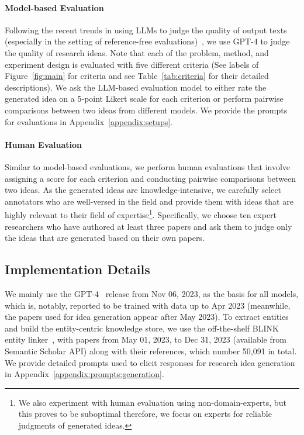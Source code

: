 \documentclass[11pt]{article}
\begin{document}
\paragraph{Model-based Evaluation}
Following the recent trends in using LLMs to judge the quality of output texts (especially in the setting of reference-free evaluations)~\cite{LLM/Judge/1, LLM/Judge/2, G-Eval}, we use GPT-4 to judge the quality of research ideas. Note that each of the problem, method, and experiment design is evaluated with five different criteria (See labels of Figure~\ref{fig:main} for criteria and see Table~\ref{tab:criteria} for their detailed descriptions). We ask the LLM-based evaluation model to either rate the generated idea on a 5-point Likert scale for each criterion or perform pairwise comparisons between two ideas from different models. We provide the prompts for evaluations in Appendix~\ref{appendix:setups}.  

\paragraph{Human Evaluation}
Similar to model-based evaluations, we perform human evaluations that involve assigning a score for each criterion and conducting pairwise comparisons between two ideas. As the generated ideas are knowledge-intensive, we carefully select annotators who are well-versed in the field and provide them with ideas that are highly relevant to their field of expertise\footnote{We also experiment with human evaluation using non-domain-experts, but this proves to be suboptimal therefore, we focus on experts for reliable judgments of generated ideas.}. Specifically, we choose ten expert researchers who have authored at least three papers and ask them to judge only the ideas that are generated based on their own papers.

\subsection{Implementation Details}
We mainly use the GPT-4~\cite{GPT-4} release from Nov 06, 2023, as the basis for all models, which is, notably, reported to be trained with data up to Apr 2023 (meanwhile, the papers used for idea generation appear after May 2023). To extract entities and build the entity-centric knowledge store, we use the off-the-shelf BLINK entity linker~\cite{blink}, with papers from May 01, 2023, to Dec 31, 2023 (available from Semantic Scholar API) along with their references, which number 50,091 in total. We provide detailed prompts used to elicit responses for research idea generation in Appendix~\ref{appendix:prompts:generation}.
\end{document}
